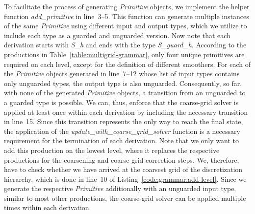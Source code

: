 To facilitate the process of generating  \emph{Primitive} objects, we implement the helper function \emph{add\_primitive} in line~3--5.
This function can generate multiple instances of the same \emph{Primitive} using different input and output types, which we utilize to include each type as a guarded and unguarded version.
Now note that each derivation starts with \emph{S\_h} and ends with the type \emph{S\_guard\_h}.
According to the productions in Table~\ref{table:multigrid-grammar}, only four unique primitives are required on each level, except for the definition of different smoothers.
For each of the \emph{Primitive} objects generated in line~7--12 whose list of input types contains only unguarded types, the output type is also unguarded.
Consequently, so far, with none of the generated \emph{Primitive} objects, a transition from an unguarded to a guarded type is possible.
We can, thus, enforce that the coarse-grid solver is applied at least once within each derivation by including the necessary transition in line~15.
Since this transition represents the only way to reach the final state, the application of the \emph{update\_with\_coarse\_grid\_solver} function is a necessary requirement for the termination of each derivation.
Note that we only want to add this production on the lowest level, where it replaces the respective productions for the coarsening and coarse-grid correction steps.
We, therefore, have to check whether we have arrived at the coarsest grid of the discretization hierarchy, which is done in line~10 of Listing~\ref{code:grammar:add-level}.
Since we generate the respective \emph{Primitive} additionally with an unguarded input type, similar to most other productions, the coarse-grid solver can be applied multiple times within each derivation.

